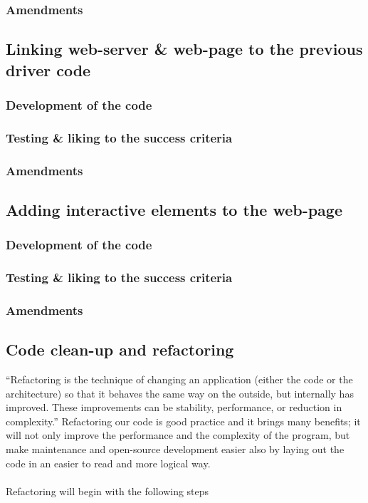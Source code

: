 \documentclass[9pt]{article}
\begin{document}
\subsubsection{Amendments}


\subsection{Linking web-server \& web-page to the previous driver code}
\subsubsection{Development of the code}
\subsubsection{Testing \& liking to the success criteria}
\subsubsection{Amendments}


\subsection{Adding interactive elements to the web-page}
\subsubsection{Development of the code}
\subsubsection{Testing \& liking to the success criteria}
\subsubsection{Amendments}






\newpage
\subsection{Code clean-up and refactoring}
``Refactoring is the technique of changing an application (either the code or the architecture) so that it behaves the same way on the outside, but internally has improved. These improvements can be stability, performance, or reduction in complexity.\cite{codeRefactoring}'' Refactoring our code is good practice and it brings many benefits; it will not only improve the performance and the complexity of the program, but make maintenance and open-source development easier also by laying out the code in an easier to read and more logical way.\\\\
Refactoring will begin with the following steps
\end{document}
